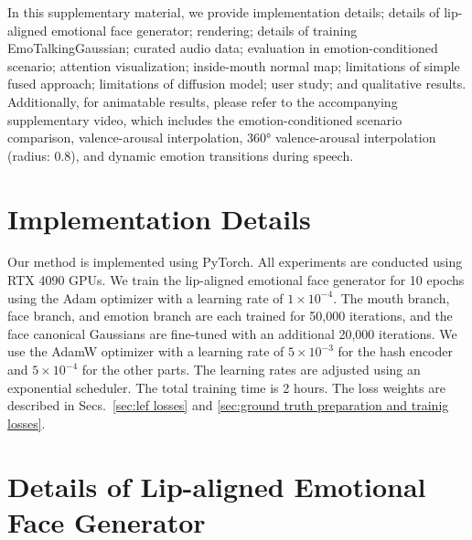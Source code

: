 \clearpage
\setcounter{page}{1}
\maketitlesupplementary


In this supplementary material, we provide implementation details; details of lip-aligned emotional face generator; rendering; details of training EmoTalkingGaussian; curated audio data; evaluation in emotion-conditioned scenario; attention visualization; inside-mouth normal map; limitations of simple fused approach; limitations of diffusion model; user study; and qualitative results. Additionally, for animatable results, please refer to the accompanying supplementary video, which includes the emotion-conditioned scenario comparison, valence-arousal interpolation, 360° valence-arousal interpolation (radius: 0.8), and dynamic emotion transitions during speech.

\section{Implementation Details}
Our method is implemented using PyTorch. All experiments are conducted using RTX 4090 GPUs. We train the lip-aligned emotional face generator for 10 epochs using the Adam optimizer with a learning rate of $1\times10^{-4}$. The mouth branch, face branch, and emotion branch are each trained for 50,000 iterations, and the face canonical Gaussians are fine-tuned with an additional 20,000 iterations. We use the AdamW optimizer with a learning rate of $5\times10^{-3}$ for the hash encoder and $5\times10^{-4}$ for the other parts. The learning rates are adjusted using an exponential scheduler. The total training time is 2 hours. The loss weights are described in Secs.~\ref{sec:lef losses} and \ref{sec:ground truth preparation and trainig losses}.


\section{Details of Lip-aligned Emotional Face Generator}

